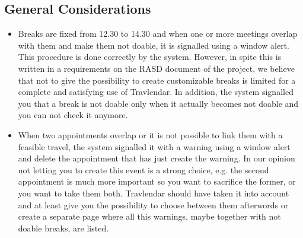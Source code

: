 \subsection{General Considerations}
\begin{itemize}
	\item Breaks are fixed from 12.30 to 14.30 and when one or more meetings overlap with them and make them not doable, it is signalled using a window alert. This procedure is done correctly by the system. However, in spite this is written in a requirements on the RASD document of the project, we believe that not to give the possibility to create customizable breaks is limited for a complete and satisfying use of Travlendar. In addition, the system signalled you that a break is not doable only when it actually becomes not doable and you can not check it anymore.
	\item When two appointments overlap or it is not possible to link them with a feasible travel, the system signalled it with a warning using a window alert and delete the appointment that has just create the warning. In our opinion not letting you to create this event is a strong choice, e.g. the second appointment is much more important so you want to sacrifice the former, or you want to take them both. Travlendar should have taken it into account and at least give you the possibility to choose between them afterwords or create a separate page where all this warnings, maybe together with not doable breaks, are listed.
\end{itemize}